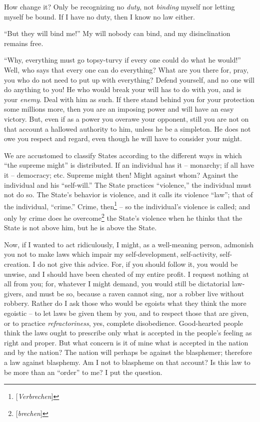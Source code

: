 How change it? Only be recognizing no \textit{duty}, not \textit{binding} 
myself nor letting myself be bound. If I have no duty, then I know no law 
either.

``But they will bind me!'' My will nobody can bind, and my disinclination 
remains free.

``Why, everything must go topsy-turvy if every one could do what he would!'' 
Well, who says that every one can do everything? What are you there for, pray, 
you who do not need to put up with everything? Defend yourself, and no one 
will do anything to you! He who would break your will has to do with you, and 
is your \textit{enemy}. Deal with him as such. If there stand behind you for 
your protection some millions more, then you are an imposing power and will 
have an easy victory. But, even if as a power you overawe your opponent, still 
you are not on that account a hallowed authority to him, unless he be a 
simpleton. He does not owe you respect and regard, even though he will have to 
consider your might.

We are accustomed to classify States according to the different ways in which 
``the supreme might'' is distributed. If an individual has it -- monarchy; 
if all have it -- democracy; etc. Supreme might then! Might against whom? 
Against the individual and his ``self-will.'' The State practices 
``violence,'' the individual must not do so. The State's behavior is 
violence, and it calls its violence ``law''; that of the individual, 
``crime.'' Crime, then\footnote{[\textit{Verbrechen}]} -- so the 
individual's violence is called; and only by crime does he 
overcome\footnote{[\textit{brechen}]} the State's violence when he thinks that 
the State is not above him, but he is above the State.

Now, if I wanted to act ridiculously, I might, as a well-meaning person, 
admonish you not to make laws which impair my self-development, self-activity, 
self-creation. I do not give this advice. For, if you should follow it, you 
would be unwise, and I should have been cheated of my entire profit. I request 
nothing at all from you; for, whatever I might demand, you would still be 
dictatorial law-givers, and must be so, because a raven cannot sing, nor a 
robber live without robbery. Rather do I ask those who would be egoists what 
they think the more egoistic -- to let laws be given them by you, and to 
respect those that are given, or to practice \textit{refractoriness}, yes, 
complete disobedience. Good-hearted people think the laws ought to prescribe 
only what is accepted in the people's feeling as right and proper. But what 
concern is it of mine what is accepted in the nation and by the nation? The 
nation will perhaps be against the blasphemer; therefore a law against 
blasphemy. Am I not to blaspheme on that account? Is this law to be more than 
an ``order'' to me? I put the question.

